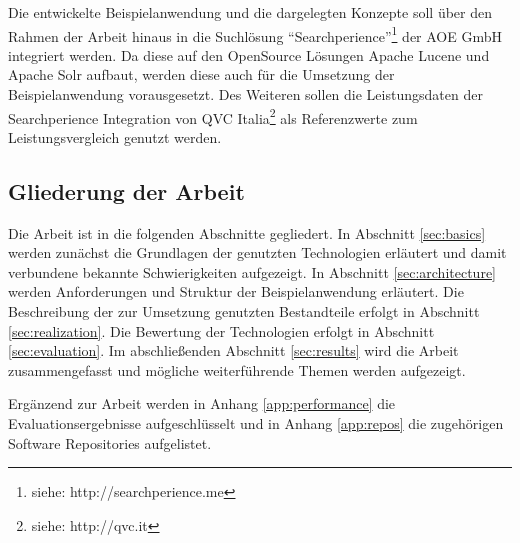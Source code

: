Die entwickelte Beispielanwendung und die dargelegten Konzepte soll über den Rahmen der Arbeit hinaus in die Suchlösung ``Searchperience''\footnote{siehe: http://searchperience.me} der AOE GmbH integriert werden. Da diese auf den OpenSource Lösungen Apache Lucene und Apache Solr aufbaut, werden diese auch für die Umsetzung der Beispielanwendung vorausgesetzt. Des Weiteren sollen die Leistungsdaten der Searchperience Integration von QVC Italia\footnote{siehe: http://qvc.it} als Referenzwerte zum Leistungsvergleich genutzt werden.

\subsection{Gliederung der Arbeit}

Die Arbeit ist in die folgenden Abschnitte gegliedert. In Abschnitt \ref{sec:basics} werden zunächst die Grundlagen der genutzten Technologien erläutert und damit verbundene bekannte Schwierigkeiten aufgezeigt. In Abschnitt \ref{sec:architecture} werden Anforderungen und Struktur der Beispielanwendung erläutert. Die Beschreibung der zur Umsetzung genutzten Bestandteile erfolgt in Abschnitt \ref{sec:realization}. Die Bewertung der Technologien erfolgt in Abschnitt \ref{sec:evaluation}. Im abschließenden Abschnitt \ref{sec:results} wird die Arbeit zusammengefasst und mögliche weiterführende Themen werden aufgezeigt.

Ergänzend zur Arbeit werden in Anhang \ref{app:performance} die Evaluationsergebnisse aufgeschlüsselt und in Anhang \ref{app:repos} die zugehörigen Software Repositories aufgelistet.


